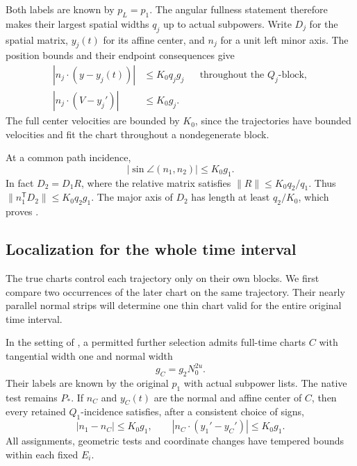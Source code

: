 Both labels are known by \(p_L=p_1\).  The angular fullness statement
therefore makes their largest spatial widths \(q_j\) up to actual
subpowers.  Write \(D_j\) for the spatial matrix, \(y_j(t)\) for its
affine center, and \(n_j\) for a unit left minor axis.  The position
bounds and their endpoint consequences give
\begin{equation}
 \label{a08:normal-strips}
 \begin{aligned}
 |n_j\cdot(y-y_j(t))|&\le K_0q_jg_j
       &&\text{throughout the \(Q_j\)-block},\\
 |n_j\cdot(V-y_j')|&\le K_0g_j .
 \end{aligned}
\end{equation}
The full center velocities are bounded by \(K_0\), since the trajectories
have bounded velocities and fit the chart throughout a nondegenerate
block.

At a common path incidence,
\begin{equation}
 \label{a08:nested-angle}
 |\sin\angle(n_1,n_2)|\le K_0g_1 .
\end{equation}
In fact \(D_2=D_1R\), where the relative matrix satisfies
\(\|R\|\le K_0q_2/q_1\).  Thus
\(\|n_1^{\mathsf T}D_2\|\le K_0q_2g_1\).
The major axis of \(D_2\) has length at least \(q_2/K_0\), which proves
.

\subsection{Localization for the whole time interval}

The true charts control each trajectory only on their own blocks.
We first compare two occurrences of the later chart on the same
trajectory.  Their nearly parallel normal strips will determine one
thin chart valid for the entire original time interval.

\begin{proposition}
 \label{prop:full-time-localization}
 In the setting of , a permitted
 further selection admits full-time charts \(C\) with tangential width
 one and normal width
 \begin{equation}
  \label{a08:C-width}
  g_C=g_2N_0^{2u}.
 \end{equation}
 Their labels are known by the original \(p_1\) with actual subpower
 lists.  The native test remains \(P_*\).  If \(n_C\) and \(y_C(t)\)
 are the normal and affine center of \(C\), then every retained
 \(Q_1\)-incidence satisfies, after a consistent choice of signs,
 \begin{equation}
  \label{a08:C-Q1-comparison}
  |n_1-n_C|\le K_0g_1,\qquad
  |n_C\cdot(y_1'-y_C')|\le K_0g_1 .
 \end{equation}
 All assignments, geometric tests and coordinate changes have tempered
 bounds within each fixed \(E_i\).
\end{proposition}

